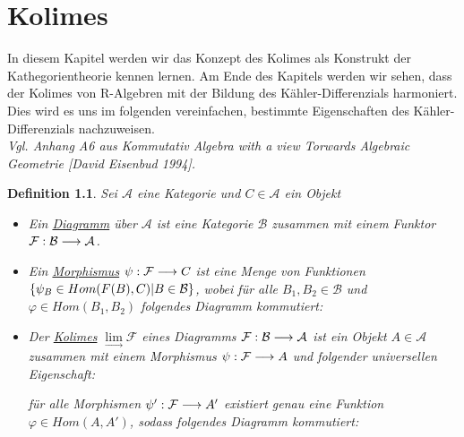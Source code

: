\documentclass[10pt,a4paper]{report}
\newcommand{\comment}[1]{}
\newcommand{\ModulsOfDifferenzials}{Kommutativ Algebra with a view Torwards Algebraic Geometrie [David Eisenbud 1994]}
\newcounter{Aussage}[chapter]
\newtheorem{definition}[Aussage]{Definition}
\newcommand{\functionfront}[3]{\nolinebreak{#1:#2 \longrightarrow #3}}
\newcommand{\colimes}[0]{\lim\limits_{ \longrightarrow }}
\begin{document}
\chapter{Kolimes}
In diesem Kapitel werden wir das Konzept des Kolimes als Konstrukt der Kathegorientheorie kennen lernen. Am Ende des Kapitels werden wir sehen, dass der Kolimes von R-Algebren mit der Bildung des Kähler-Differenzials harmoniert. Dies wird es uns im folgenden vereinfachen, bestimmte Eigenschaften des Kähler-Differenzials nachzuweisen.\\
\textit{Vgl. Anhang A6 aus \ModulsOfDifferenzials .}
\begin{definition}
Sei $\mathcal{A}$ eine Kategorie und $C \in \mathcal{A}$ ein Objekt
\begin{itemize}
\item Ein \underline{Diagramm} über $\mathcal{A}$ ist eine Kategorie $\mathcal{B}$ zusammen mit einem Funktor $\functionfront{\mathcal{F}}{\mathcal{B}}{\mathcal{A}}$.
\item Ein \underline{Morphismus} $\functionfront{\psi}{\mathcal{F}}{C}$ ist eine Menge von Funktionen 
$\nolinebreak{\lbrace \psi_B \in Hom(F(B),C) \vert B \in \mathcal{B} \rbrace}$, wobei für alle $B_1,B_2 \in \mathcal{B}$ und $\varphi \in Hom(B_1,B_2)$ folgendes Diagramm kommutiert:
\begin{center}
\end{center}
\item Der \underline{Kolimes} $\colimes \mathcal{F}$ eines Diagramms $\functionfront{\mathcal{F}}{\mathcal{B}}{\mathcal{A}}$ ist ein Objekt $A \in \mathcal{A}$ zusammen mit einem Morphismus $\functionfront{\psi}{\mathcal{F}}{A}$ und folgender universellen Eigenschaft:
\begin{center}
\comment{$\forall Morphismen \functionfront{\psi '}{\mathcal{F}}{\mathcal{A}'}\exists ! \varphi \in Hom_{\mathcal{A}}(A,A') \forall B \in \mathcal{B}: \varphi \circ \psi_B = \psi'_B $}

für alle Morphismen $\functionfront{\psi '}{\mathcal{F}}{A'}$ existiert genau eine Funktion $\varphi \in Hom(A,A')$, sodass folgendes Diagramm kommutiert:
\end{center}
\end{itemize}
\end{definition}
\end{document}
